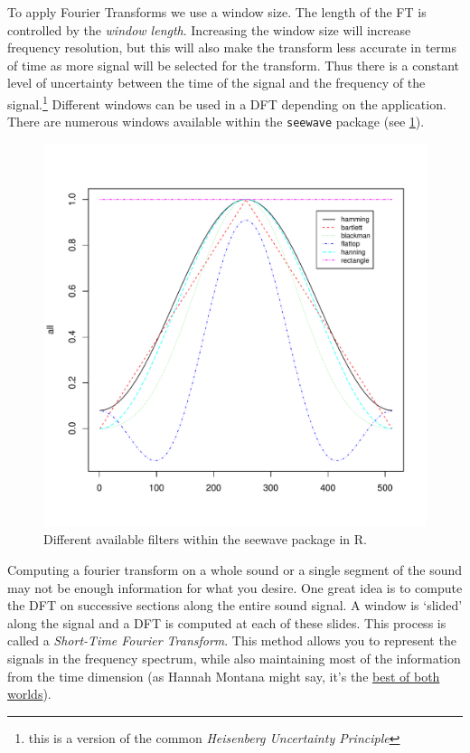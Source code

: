 \documentclass[12pt,oneside]{book}\usepackage[]{graphicx}\usepackage[]{color}
\makeatletter
\def\maxwidth{ %
  \ifdim\Gin@nat@width>\linewidth
    \linewidth
  \else
    \Gin@nat@width
  \fi
}
\newenvironment{knitrout}{}{} %
\makeatother
\begin{document}
{{{{To apply Fourier Transforms we use a window size. The length of the FT is controlled by the \emph{window length}. Increasing the window size will increase frequency resolution, but this will also make the transform less accurate in terms of time as more signal will be selected for the transform. Thus there is a constant level of uncertainty between the time of the signal and the frequency of the signal.\footnote{this is a version of the common \emph{Heisenberg Uncertainty Principle}} Different windows can be used in a DFT depending on the application. There are numerous windows available within the \verb+seewave+ package (see \ref{FIG:FILTERS}). 

\begin{figure}[htbp]
\begin{knitrout}
\color{fgcolor}
\includegraphics[width=\maxwidth]{figure/unnamed-chunk-311-1} 

\end{knitrout}
\caption{Different available filters within the seewave package in R.}
\label{FIG:FILTERS}
\end{figure}

Computing a fourier transform on a whole sound or a single segment of the sound may not be enough information for what you desire. One great idea is to compute the DFT on successive sections along the entire sound signal. A window is `slided' along the signal and a DFT is computed at each of these slides. This process is called a \emph{Short-Time Fourier Transform}. This method allows you to represent the signals in the frequency spectrum, while also maintaining most of the information from the time dimension (as Hannah Montana might say, it's the \href{https://www.youtube.com/watch?v=uVjRe8QXFHY}{best of both worlds}). 

}}}}
\end{document}

